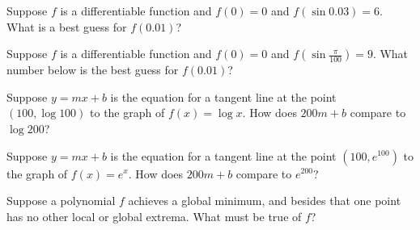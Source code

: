 \documentclass{ximera}
\newcommand{\recommendation}[1]{}
\begin{document}
\begin{problem}
  Suppose $f$ is a differentiable function and $f(0) = 0$ and
  $f(\sin 0.03) = 6$.  What is a best guess for $f(0.01)$?
  \begin{multipleChoice}
  \end{multipleChoice}
\end{problem}

\begin{problem}
  Suppose $f$ is a differentiable function and $f(0) = 0$ and
  $f(\sin \frac{\pi}{100}) = 9$.  What number below is the best guess for $f(0.01)$?
  \begin{multipleChoice}
  \end{multipleChoice}
\end{problem}

\begin{problem}
\recommendation{Vic}
  Suppose $y = mx + b$ is the equation for a tangent line at the point $(100,\log 100)$ to the graph of $f(x) = \log x$.  How does $200m + b$ compare to $\log 200$?
  \begin{multipleChoice}
  \end{multipleChoice}
\end{problem}

\begin{problem}
  Suppose $y = mx + b$ is the equation for a tangent line at the point $(100,e^{100})$ to the graph of $f(x) = e^x$.  How does $200m + b$ compare to $e^{200}$?
  \begin{multipleChoice}
  \end{multipleChoice}
\end{problem}

\begin{problem}
  Suppose a polynomial $f$ achieves a global minimum, and besides that
  one point has no other local or global extrema.  What must be true
  of $f$?
  \begin{multipleChoice}
  \end{multipleChoice}
\end{problem}
\end{document}
